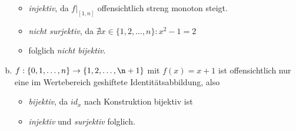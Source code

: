 \documentclass{scrreprt}
\begin{document}
\begin{enumerate}[a)]
				\begin{itemize}
						\item
							\emph{injektiv}, da $f|_{[1, n]}$ offensichtlich streng monoton steigt.
						\item
							\emph{nicht surjektiv}, da $\nexists x \in \lbrace 1, 2, \dots, n\rbrace: x^2 - 1 = 2$
						\item
							folglich \emph{nicht bijektiv}.
				\end{itemize}
			\item
				$f: \lbrace 0, 1, \dots, n \rbrace \to \lbrace 1, 2, \dots , \n+1 \rbrace$ mit $f(x) = x+1$ ist offensichtlich nur eine im Wertebereich geshiftete Identitätsabbildung, also
				\begin{itemize}
					\item
						\emph{bijektiv}, da $id_x$ nach Konstruktion bijektiv ist
					\item
						\emph{injektiv} und \emph{surjektiv} folglich.
				\end{itemize}
	\end{enumerate}

	\pagebreak
\end{document}
